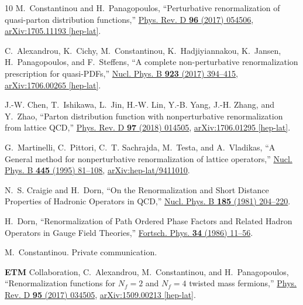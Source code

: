 \begin{thebibliography}{10}
M.~Constantinou and H.~Panagopoulos, ``{Perturbative renormalization of
  quasi-parton distribution functions},''
  \href{http://dx.doi.org/10.1103/PhysRevD.96.054506}{Phys. Rev. D {\bfseries
  96} (2017) 054506},
\href{http://arxiv.org/abs/1705.11193}{{\ttfamily arXiv:1705.11193 [hep-lat]}}.

C.~Alexandrou, K.~Cichy, M.~Constantinou, K.~Hadjiyiannakou, K.~Jansen,
  H.~Panagopoulos, and F.~Steffens, ``{A complete non-perturbative
  renormalization prescription for quasi-PDFs},''
  \href{http://dx.doi.org/10.1016/j.nuclphysb.2017.08.012}{Nucl. Phys. B
  {\bfseries 923} (2017) 394--415},
\href{http://arxiv.org/abs/1706.00265}{{\ttfamily arXiv:1706.00265 [hep-lat]}}.

J.-W. Chen, T.~Ishikawa, L.~Jin, H.-W. Lin, Y.-B. Yang, J.-H. Zhang, and
  Y.~Zhao, ``Parton distribution function with nonperturbative renormalization
  from lattice {QCD},''
  \href{http://dx.doi.org/10.1103/PhysRevD.97.014505}{Phys. Rev. D {\bfseries
  97} (2018) 014505},
\href{http://arxiv.org/abs/1706.01295}{{\ttfamily arXiv:1706.01295 [hep-lat]}}.

G.~Martinelli, C.~Pittori, C.~T. Sachrajda, M.~Testa, and A.~Vladikas, ``{A
  General method for nonperturbative renormalization of lattice operators},''
  \href{http://dx.doi.org/10.1016/0550-3213(95)00126-D}{Nucl. Phys. B
  {\bfseries 445} (1995) 81--108},
\href{http://arxiv.org/abs/hep-lat/9411010}{{\ttfamily arXiv:hep-lat/9411010}}.

N.~S. Craigie and H.~Dorn, ``{On the Renormalization and Short Distance
  Properties of Hadronic Operators in {QCD}},''
\href{http://dx.doi.org/10.1016/0550-3213(81)90372-2}{Nucl. Phys. B {\bfseries
  185} (1981) 204--220}.

H.~Dorn, ``{Renormalization of Path Ordered Phase Factors and Related Hadron
  Operators in Gauge Field Theories},''
\href{http://dx.doi.org/10.1002/prop.19860340104}{Fortsch. Phys. {\bfseries 34}
  (1986) 11--56}.

M.~Constantinou. Private communication.

{\bfseries ETM} Collaboration, C.~Alexandrou, M.~Constantinou, and
  H.~Panagopoulos, ``{Renormalization functions for $N_f=2$ and $N_f=4$ twisted
  mass fermions},'' \href{http://dx.doi.org/10.1103/PhysRevD.95.034505}{Phys.
  Rev. D {\bfseries 95} (2017) 034505},
\href{http://arxiv.org/abs/1509.00213}{{\ttfamily arXiv:1509.00213 [hep-lat]}}.


\end{thebibliography}
